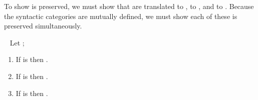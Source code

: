 To show  is preserved, we must show that  are
translated to ,  to
, and  to .
Because the syntactic categories are mutually defined, we must show each of
these is preserved simultaneously.
\begin{theorem}
  ~
  Let \im{\styjudg{\slenv}{\se}{\sA}};
  \begin{enumerate}
    \item If \im{\se} is \im{\sV} then \im{\cctrans{\sV} = \tV}.
    \item If \im{\se} is \im{\sN} then \im{\cctrans{\sN} = \tN}.
    \item If \im{\se} is \im{\sM} then \im{\cctrans{\sM} = \tM}.
  \end{enumerate}
\end{theorem}
